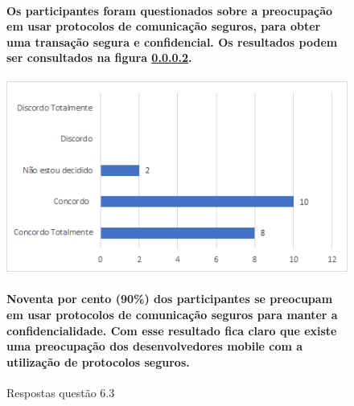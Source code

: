 \begin{figure}[!t]
\centering
\paragraph{Os participantes foram questionados  sobre a preocupação em usar protocolos de comunicação seguros, para obter uma transação segura e confidencial. Os resultados podem ser consultados na figura \ref{fig:6.3}.}
\includegraphics[scale=0.7]{figuras das questoes/6.3.png}
\caption{Respostas questão 6.3}
\paragraph{Noventa por cento (90{\%}) dos participantes se preocupam em usar protocolos de comunicação seguros para manter a confidencialidade. Com esse resultado fica claro que existe uma preocupação dos desenvolvedores mobile com a utilização de protocolos seguros.}
\label{fig:6.3}
\end{figure}
